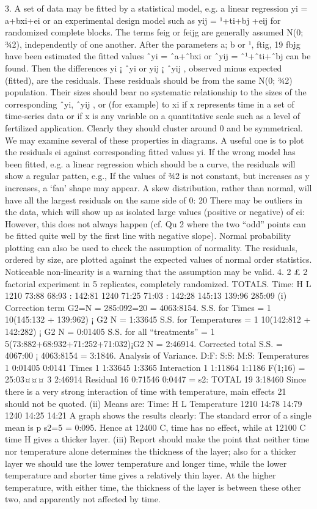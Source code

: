 3. A set of data may be fitted by a statistical model, e.g. a linear regression yi =
a+bxi+ei or an experimental design model such as yij = ¹+ti+bj +eij for
randomized complete blocks. The terms feig or feijg are generally assumed
N(0; ¾2), independently of one another. After the parameters a; b or ¹, ftig,
19
fbjg have been estimated the fitted values ˆyi = ˆa+ˆbxi or ˆyij = ˆ¹+ˆti+ˆbj can
be found. Then the differences yi ¡ ˆyi or yij ¡ ˆyij , observed minus expected
(fitted), are the residuals. These residuals should be from the same N(0; ¾2)
population. Their sizes should bear no systematic relationship to the sizes
of the corresponding ˆyi, ˆyij , or (for example) to xi if x represents time in a
set of time-series data or if x is any variable on a quantitative scale such as
a level of fertilized application. Clearly they should cluster around 0 and be
symmetrical. We may examine several of these properties in diagrams. A
useful one is to plot the residuals ei against corresponding fitted values yi.
If the wrong model has been fitted, e.g. a linear regression which should be
a curve, the residuals will show a regular patten, e.g.,
If the values of ¾2 is not constant, but increases as y increases, a ‘fan’ shape
may appear.
A skew distribution, rather than normal, will have all the largest residuals
on the same side of 0:
20
There may be outliers in the data, which will show up as isolated large values
(positive or negative) of ei:
However, this does not always happen (cf. Qu 2 where the two “odd” points
can be fitted quite well by the first line with negative slope). Normal probability
plotting can also be used to check the assumption of normality. The
residuals, ordered by size, are plotted against the expected values of normal
order statistics. Noticeable non-linearity is a warning that the assumption
may be valid.
4. 2 £ 2 factorial experiment in 5 replicates, completely randomized.
TOTALS.
Time: H L
1210 73:88 68:93 : 142:81
1240 71:25 71:03 : 142:28
145:13 139:96 285:09
(i) Correction term G2=N = 285:092=20 = 4063:8154.
S.S. for Times = 1
10(145:132 + 139:962) ¡ G2
N = 1:33645
S.S. for Temperatures = 1
10(142:812 + 142:282) ¡ G2
N = 0:01405
S.S. for all “treatments” = 1
5(73:882+68:932+71:252+71:032)¡G2
N = 2:46914.
Corrected total S.S. = 4067:00 ¡ 4063:8154 = 3:1846.
Analysis of Variance.
D:F: S:S: M:S:
Temperatures 1 0:01405 0:0141
Times 1 1:33645 1:3365
Interaction 1 1:11864 1:1186 F(1;16) = 25:03¤¤¤
3 2:46914
Residual 16 0:71546 0:0447 = s2:
TOTAL 19 3:18460
Since there is a very strong interaction of time with temperature, main effects
21
should not be quoted.
(ii) Means are:
Time: H L
Temperature 1210 14:78 14:79
1240 14:25 14:21
A graph shows the results clearly:
The standard error of a single mean is
p
s2=5 = 0:095. Hence at 12400 C,
time has no effect, while at 12100 C time H gives a thicker layer.
(iii) Report should make the point that neither time nor temperature alone
determines the thickness of the layer; also for a thicker layer we should
use the lower temperature and longer time, while the lower temperature
and shorter time gives a relatively thin layer. At the higher temperature,
with either time, the thickness of the layer is between these other two, and
apparently not affected by time.
